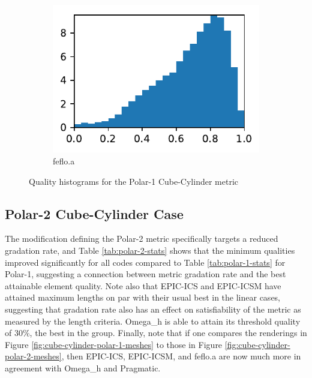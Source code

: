 \documentclass[3p,times,procedia,number]{elsarticle}
\begin{document}
\begin{figure}
\begin{subfigure}{.16\textwidth}
\includegraphics[width=\textwidth]{fefloa-cube-cylinder-polar-1-quality.pdf}
\caption{feflo.a}
\end{subfigure}
\caption{Quality histograms for the Polar-1 Cube-Cylinder metric}
\label{fig:cube-cylinder-polar-1-qualities}
\end{figure}

\subsection{Polar-2 Cube-Cylinder Case}
\label{sec:cube-cylinder-polar-2}

The modification defining the Polar-2 metric specifically targets
a reduced gradation rate, and Table \ref{tab:polar-2-stats}
shows that the minimum qualities improved significantly for all
codes compared to Table \ref{tab:polar-1-stats} for Polar-1, suggesting a
connection between metric gradation rate and the best attainable
element quality.
Note also that EPIC-ICS and EPIC-ICSM have attained maximum lengths
on par with their usual best in the linear cases, suggesting that
gradation rate also has an effect on satisfiability of the metric
as measured by the length criteria.
Omega\_h is able to attain its threshold quality of 30\%, the best in the group.
Finally, note that if one compares the renderings
in Figure \ref{fig:cube-cylinder-polar-1-meshes} to those in
Figure \ref{fig:cube-cylinder-polar-2-meshes}, then EPIC-ICS,
EPIC-ICSM, and feflo.a are now much more in agreement with
Omega\_h and Pragmatic.
\end{document}
